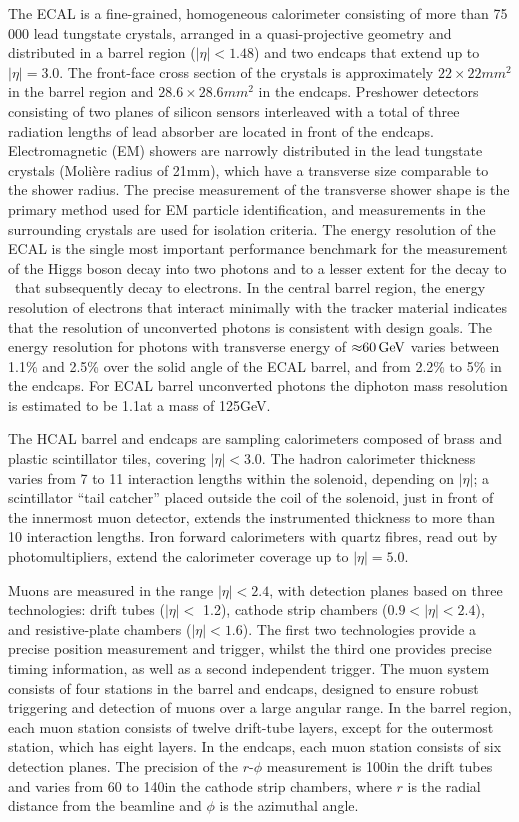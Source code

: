 \documentclass[11pt,twoside,a4paper,cmspaper,final,collab]{cms-tdr}
\begin{document}
The ECAL is a fine-grained, homogeneous calorimeter consisting of more than 75\,000
lead tungstate crystals, arranged in a quasi-projective geometry and distributed in a
barrel region ($|\eta| < 1.48$) and two endcaps that extend up to $|\eta| = 3.0$.
The front-face cross section of the crystals is approximately $22\times 22\unit{mm}^2$ in the barrel region
and $28.6\times 28.6\unit{mm}^2$ in the endcaps.
Preshower detectors consisting of two planes of silicon sensors interleaved with a total of
three radiation lengths of lead absorber are located in front of the endcaps.  Electromagnetic (EM)
showers
are narrowly distributed in the lead tungstate crystals (Moli\`ere radius of 21\unit{mm}), which have a transverse size
comparable to the shower radius.  The precise measurement of the transverse shower shape is the
primary method used for EM particle identification, and measurements in the surrounding crystals
are used for isolation criteria.
The energy resolution of the ECAL is the single most important performance
benchmark for the measurement of the Higgs boson decay into two photons and to a lesser extent
for the decay to \cPZ\cPZ\ that subsequently decay to electrons.
In the central barrel region, the energy resolution of electrons that
interact minimally with the tracker material indicates that the resolution of
unconverted photons is consistent with design goals.
The energy resolution for photons with transverse energy of ${\approx}60\,\text{Ge\hspace{-.08em}V}$ varies
between 1.1\% and 2.5\% over the solid angle of the ECAL barrel, and from 2.2\% to 5\% in the endcaps.
For ECAL barrel unconverted photons the diphoton mass resolution is estimated to be
1.1\GeV at a mass of 125\unit{GeV}.


The HCAL barrel and endcaps are sampling calorimeters composed of brass and
plastic scintillator tiles, covering $|\eta| < 3.0$. The hadron calorimeter thickness varies from 7 to 11
interaction lengths within the solenoid, depending on $|\eta|$; a scintillator ``tail catcher'' placed outside
the coil of the solenoid, just in front of the innermost muon detector, extends the instrumented thickness
to more
than 10 interaction lengths.  Iron forward calorimeters with quartz fibres, read
out by photomultipliers, extend the calorimeter coverage up to
$|\eta| = 5.0$.

Muons are measured in the range $|\eta| < 2.4$, with detection planes based on
three technologies: drift tubes ($|\eta| <$ 1.2), cathode strip chambers
($0.9 < |\eta| < 2.4$), and resistive-plate chambers ($|\eta| < 1.6$).
The first two technologies provide a precise position measurement and
trigger, whilst the third one provides precise timing
information, as well as a second independent trigger.
The muon system consists of four stations in the barrel and endcaps, designed to ensure robust
triggering and detection of muons
over a large angular range. In the barrel region, each muon station consists of twelve
drift-tube layers, except for the outermost station, which has eight layers. In the endcaps, each
muon station consists of six detection planes. The precision of the $r$-$\phi$
measurement is 100\mum in the drift tubes and varies from 60 to
140\mum in the cathode strip chambers, where $r$ is the radial distance from the beamline and $\phi$
is the azimuthal angle.
\end{document}
